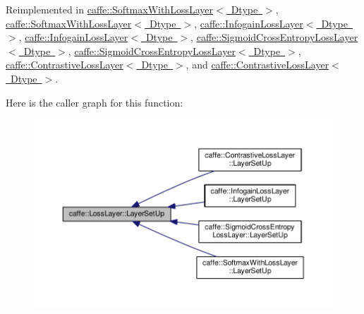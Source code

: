 Reimplemented in \mbox{\hyperlink{classcaffe_1_1_softmax_with_loss_layer_a96cd04896d4b805fcaf36c2c6522ae10}{caffe\+::\+Softmax\+With\+Loss\+Layer$<$ Dtype $>$}}, \mbox{\hyperlink{classcaffe_1_1_softmax_with_loss_layer_a2a3985570178431a4cc3f9b9fd4378c2}{caffe\+::\+Softmax\+With\+Loss\+Layer$<$ Dtype $>$}}, \mbox{\hyperlink{classcaffe_1_1_infogain_loss_layer_a772be3f4074c72b3cf9214bda3422402}{caffe\+::\+Infogain\+Loss\+Layer$<$ Dtype $>$}}, \mbox{\hyperlink{classcaffe_1_1_infogain_loss_layer_ae59c01de80f22c87c1dd2ef87c6e6a2f}{caffe\+::\+Infogain\+Loss\+Layer$<$ Dtype $>$}}, \mbox{\hyperlink{classcaffe_1_1_sigmoid_cross_entropy_loss_layer_aa1535140dd4eb94557c3afc89076d56d}{caffe\+::\+Sigmoid\+Cross\+Entropy\+Loss\+Layer$<$ Dtype $>$}}, \mbox{\hyperlink{classcaffe_1_1_sigmoid_cross_entropy_loss_layer_ac67af0cc1033db08d47a3f56aff5d600}{caffe\+::\+Sigmoid\+Cross\+Entropy\+Loss\+Layer$<$ Dtype $>$}}, \mbox{\hyperlink{classcaffe_1_1_contrastive_loss_layer_a943e67e7bb9c2362ec20ce44c777beac}{caffe\+::\+Contrastive\+Loss\+Layer$<$ Dtype $>$}}, and \mbox{\hyperlink{classcaffe_1_1_contrastive_loss_layer_a957623c05cb2289cd2ae9e9e93b48969}{caffe\+::\+Contrastive\+Loss\+Layer$<$ Dtype $>$}}.

Here is the caller graph for this function\+:
\nopagebreak
\begin{figure}[H]
\begin{center}
\leavevmode
\includegraphics[width=350pt]{classcaffe_1_1_loss_layer_aa6fc7c2e90be66f1c1f0683637c949da_icgraph}
\end{center}
\end{figure}
\mbox{\label{classcaffe_1_1_loss_layer_a1324e1bd42d84a6eb7e2c559d2da9ecc}} 
